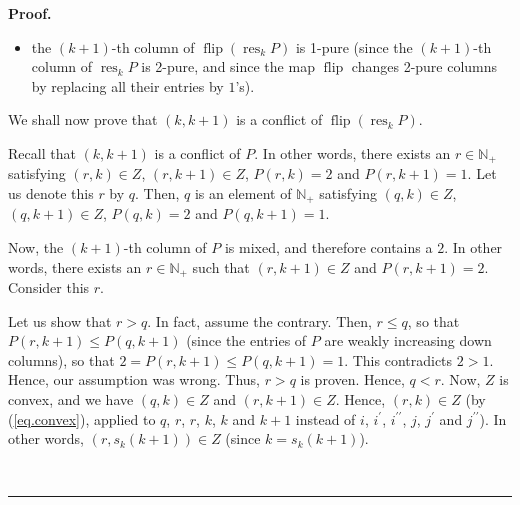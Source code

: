 \documentclass[numbers=enddot,12pt,final,onecolumn,notitlepage]{scrartcl}%
\theoremstyle{definition}
\newenvironment{proof}[1][Proof]{\noindent\textbf{#1.} }{\ \rule{0.5em}{0.5em}}
\begin{document}
\begin{proof}
\begin{itemize}
\item the $\left(  k+1\right)  $-th column of $\operatorname*{flip}\left(
\operatorname*{res}\nolimits_{k}P\right)  $ is 1-pure (since the $\left(
k+1\right)  $-th column of $\operatorname*{res}\nolimits_{k}P$ is 2-pure, and
since the map $\operatorname*{flip}$ changes 2-pure columns by replacing all
their entries by $1$'s).
\end{itemize}

We shall now prove that $\left(  k,k+1\right)  $ is a conflict of
$\operatorname*{flip}\left(  \operatorname*{res}\nolimits_{k}P\right)  $.

Recall that $\left(  k,k+1\right)  $ is a conflict of $P$. In other words,
there exists an $r\in\mathbb{N}_{+}$ satisfying $\left(  r,k\right)  \in Z$,
$\left(  r,k+1\right)  \in Z$, $P\left(  r,k\right)  =2$ and $P\left(
r,k+1\right)  =1$. Let us denote this $r$ by $q$. Then, $q$ is an element of
$\mathbb{N}_{+}$ satisfying $\left(  q,k\right)  \in Z$, $\left(
q,k+1\right)  \in Z$, $P\left(  q,k\right)  =2$ and $P\left(  q,k+1\right)
=1$.

Now, the $\left(  k+1\right)  $-th column of $P$ is mixed, and therefore
contains a $2$. In other words, there exists an $r\in\mathbb{N}_{+}$ such that
$\left(  r,k+1\right)  \in Z$ and $P\left(  r,k+1\right)  =2$. Consider this
$r$.

Let us show that $r>q$. In fact, assume the contrary. Then, $r\leq q$, so that
$P\left(  r,k+1\right)  \leq P\left(  q,k+1\right)  $ (since the entries of
$P$ are weakly increasing down columns), so that $2=P\left(  r,k+1\right)
\leq P\left(  q,k+1\right)  =1$. This contradicts $2>1$. Hence, our assumption
was wrong. Thus, $r>q$ is proven. Hence, $q<r$. Now, $Z$ is convex, and we
have $\left(  q,k\right)  \in Z$ and $\left(  r,k+1\right)  \in Z$. Hence,
$\left(  r,k\right)  \in Z$ (by (\ref{eq.convex}), applied to $q$, $r$, $r$,
$k$, $k$ and $k+1$ instead of $i$, $i^{\prime}$, $i^{\prime\prime}$, $j$,
$j^{\prime}$ and $j^{\prime\prime}$). In other words, $\left(  r,s_{k}\left(
k+1\right)  \right)  \in Z$ (since $k=s_{k}\left(  k+1\right)  $).


\end{proof}
\end{document}
